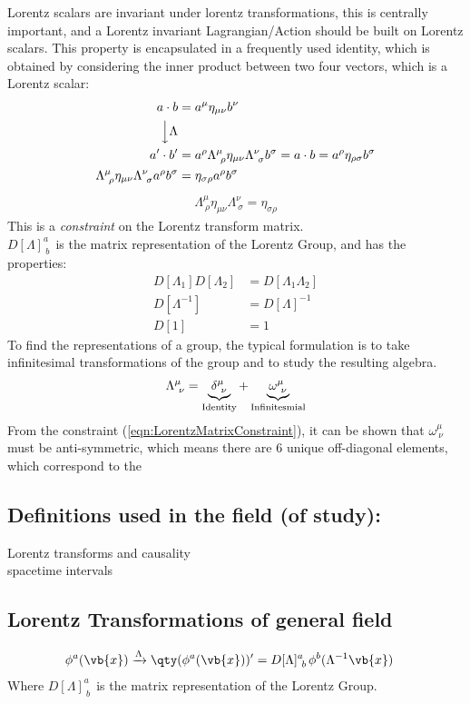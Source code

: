 Lorentz scalars are invariant under lorentz transformations, this is centrally important, and a Lorentz invariant Lagrangian/Action should be built on Lorentz scalars. This property is encapsulated in a 
frequently used identity, which is obtained by considering the inner product between two four vectors, which is a Lorentz scalar:
\begin{align*}
	a\cdot b&=a^{\mu}\eta_{\mu\nu}b^{\nu}
	\\
	\Big\downarrow\Lambda& \notag \\
	a^{\prime}\cdot b^{\prime}&=a^{\rho}\Lambda^{\mu}_{~\rho}\eta_{\mu\nu} \Lambda^{\nu}_{~\sigma}b^{\sigma}=a\cdot b=a^{\rho}\eta_{\rho\sigma}b^{\sigma}
	\\
	\Lambda^{\mu}_{~\rho}\eta_{\mu\nu} \Lambda^{\nu}_{~\sigma}a^{\rho}b^{\sigma}&=\eta_{\sigma\rho}a^{\rho}b^{\sigma}
\end{align*}
\begin{align}		
	\boxed{\Lambda^{\mu}_{~\rho}\eta_{\mu\nu} \Lambda^{\nu}_{~\sigma}=\eta_{\sigma\rho}}\label{eqn:LorentzMatrixConstraint}
\end{align}
This is a \emph{constraint} on the Lorentz transform matrix.
\\
\(D[\Lambda]^{a}_{~b\,}\) is the matrix representation of the Lorentz Group, and has the properties:
\begin{align*}
	D[\Lambda_1]D[\Lambda_2]&=D[\Lambda_1\Lambda_2]
	\\
	D[\Lambda^{-1}]&=D[\Lambda]^{-1}
	\\
	D[1]&=1
\end{align*}
To find the representations of a group, the typical formulation is to take infinitesimal transformations of the group and to study the resulting algebra. 
\begin{align*}
	\Lambda^{\mu}_{~\nu}=\underbrace{\delta^{\mu}_{~\nu}}_{\rm Identity}+\underbrace{\omega^{\mu}_{~\nu}}_{\rm Infinitesmial}
\end{align*}
From the constraint (\ref{eqn:LorentzMatrixConstraint}), it can be shown that \(\omega^{\mu}_{~\nu}\) must be anti-symmetric, which means there are 6 unique off-diagonal elements, which correspond to the 
\subsection{Definitions used in the field (of study):}
Lorentz transforms and causality
\\
spacetime intervals

\subsection{Lorentz Transformations of general field}
\begin{align}
	\phi^{a}(\vb{x})&\xrightarrow{\Lambda}\qty(\phi^{a}(\vb{x}))^{\prime}=D[\Lambda]^{a}_{~b\,}\phi^{b}(\Lambda^{-1}\vb{x})
\end{align}
Where \(D[\Lambda]^{a}_{~b\,}\) is the matrix representation of the Lorentz Group.
